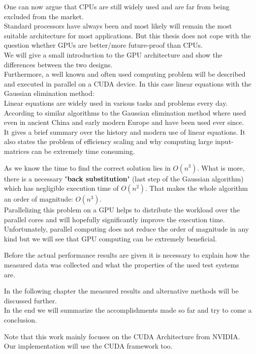 \documentclass[draft, final]{vutinfth} %
\begin{document}
	One can now argue that CPUs are still widely used and are far from being excluded from the market.\\
	Standard processors have always been and most likely will remain the most suitable architecture for most applications. But this thesis does not cope with the question whether GPUs are better/more future-proof than CPUs.\\
	We will give a small introduction to the GPU architecture and show the differences between the two designs.\\
	Furthermore, a well known and often used computing problem will be described and executed in parallel on a CUDA device. In this case linear equations with the Gaussian elimination method:\\
	Linear equations are widely used in various tasks and problems every day. According to \cite{Grcar2011163} similar algorithms to the Gaussian elimination method where used even in ancient China and early modern Europe and have been used ever since.\\
	It gives a brief summary over the history and modern use of linear equations. It also states the problem of efficiency scaling and why computing large input-matrices can be extremely time consuming.

	As we know the time to find the correct solution lies in $O(n^{3})$. What is more, there is a necessary "\textbf{back substitution}" (last step of the Gaussian algorithm) which has negligible execution time of $O(n^2)$. That makes the whole algorithm an order of magnitude: $O(n^3)$.\\
	Parallelizing this problem on a GPU helps to distribute the workload over the parallel cores and will hopefully significantly improve the execution time. Unfortunately, parallel computing does not reduce the order of magnitude in any kind but we will see that GPU computing can be extremely beneficial.

	Before the actual performance results are given it is necessary to explain how the measured data was collected and what the properties of the used test systems are.

	In the following chapter the measured results and alternative methods will be discussed further.\\
	In the end we will summarize the accomplishments made so far and try to come a conclusion.

	Note that this work mainly focuses on the CUDA Architecture from NVIDIA. Our implementation will use the CUDA framework too.
\end{document}
